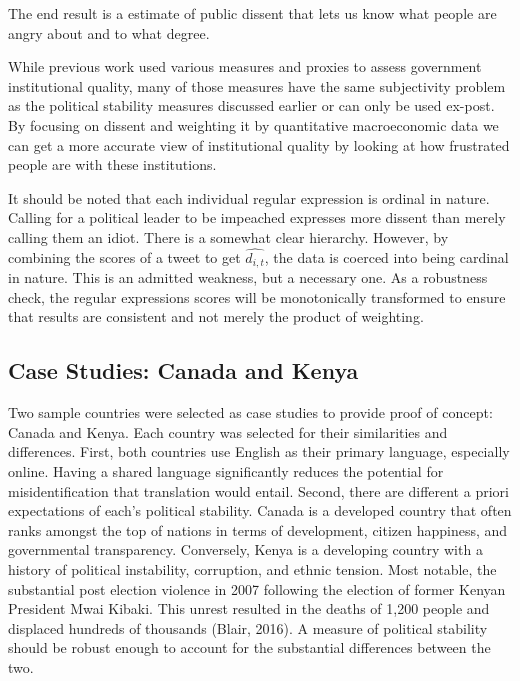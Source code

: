 \documentclass[12pt]{article}
\begin{document}
\begin{spacing}{1.5}
\noindent The end result is a estimate of public dissent that lets us know what people are angry about and to what degree. 

While previous work used various measures and proxies to assess government institutional quality, many of those measures have the same subjectivity problem as the political stability measures discussed earlier or can only be used ex-post. By focusing on dissent and weighting it by quantitative macroeconomic data we can get a more accurate view of institutional quality by looking at how frustrated people are with these institutions. 

It should be noted that each individual regular expression is ordinal in nature. Calling for a political leader to be impeached expresses more dissent than merely calling them an idiot. There is a somewhat clear hierarchy. However, by combining the scores of a tweet to get $\hat{d_{i,t}}$, the data is coerced into being cardinal in nature. This is an admitted weakness, but a necessary one. As a robustness check, the regular expressions scores will be monotonically transformed to ensure that results are consistent and not merely the product of weighting. 

\subsection*{Case Studies: Canada and Kenya}

Two sample countries were selected as case studies to provide proof of concept: Canada and Kenya. Each country was selected for their similarities and differences. First, both countries use English as their primary language, especially online. Having a shared language significantly reduces the potential for misidentification that translation would entail. Second, there are different a priori expectations of each’s political stability. Canada is a developed country that often ranks amongst the top of nations in terms of development, citizen happiness, and governmental transparency. Conversely, Kenya is a developing country with a history of political instability, corruption, and ethnic tension. Most notable, the substantial post election violence in 2007 following the election of former Kenyan President Mwai Kibaki. This unrest resulted in the deaths of 1,200 people and displaced hundreds of thousands (Blair, 2016). A measure of political stability should be robust enough to account for the substantial differences between the two.  


\end{spacing}
\end{document}
